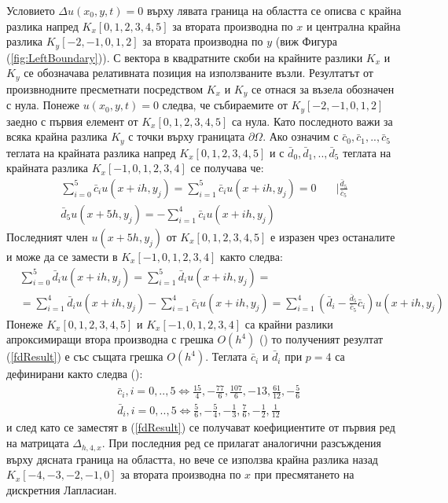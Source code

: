 \documentclass{article}
\newcommand{\rf}[1]{(\ref{#1})}
\begin{document}
Условието $\Delta u(x_0, y, t) = 0$ върху лявата граница на областта се описва с крайна разлика напред $K_x[0,1,2,3,4,5]$ за втората производна по $x$ и централна крайна разлика $K_y[-2,-1,0,1,2]$ за втората производна по $y$ (виж Фигура \rf{fig:LeftBoundary}). С вектора в квадратните скоби на крайните разлики $K_x$ и $K_y$ се обозначава релативната позиция на използваните възли. Резултатът от произвнодните пресметнати посредством $K_x$ и $K_y$ се отнася за възела обозначен с нула. Понеже $u(x_0, y, t) = 0$ следва, че събираемите от $K_y[-2,-1,0,1,2]$ заедно с първия елемент от $K_x[0,1,2,3,4,5]$ са нула. Като последното важи за всяка крайна разлика $K_y$ с точки върху границата $\partial \Omega$. Ако означим с $\bar c_0, \bar c_1, .., \bar c_5$ теглата на крайната разлика напред $K_x[0,1,2,3,4,5]$ и с $\bar d_0, \bar d_1,.., \bar d_5$ теглата на крайната разлика $K_x[-1,0,1,2,3,4]$ се получава че:
\begin{align}
\sum\limits_{i=0}^{5} \bar c_i u(x+ih, y_j) = \sum\limits_{i=1}^{5} \bar c_i u(x+ih, y_j) = 0 &  \quad | \frac{\bar d_5}{\bar c_5} \nonumber\\
\bar d_5 u(x+5h, y_j) = -\sum\limits_{i=1}^{4} \bar c_i u(x+ih, y_j) & \nonumber
\end{align}
Последният член $u(x+5h, y_j)$ от $K_x[0,1,2,3,4,5]$ е изразен чрез останалите и може да се замести в $K_x[-1,0,1,2,3,4]$ както следва:
\begin{align}\label{fdResult}
&\sum\limits_{i=0}^{5} \bar d_i u(x+ih, y_j) = \sum\limits_{i=1}^{5} \bar d_i u(x+ih, y_j)  =  \\
&= \sum\limits_{i=1}^{4} \bar d_i u(x+ih, y_j) -\sum\limits_{i=1}^{4} \bar c_i u(x+ih, y_j) = \sum\limits_{i=1}^{4} \left( \bar d_i - \frac{\bar d_5}{\bar c_5} \bar c_i \right) u(x+ih, y_j) \nonumber
\end{align}
Понеже $K_x[0,1,2,3,4,5]$ и $K_x[-1,0,1,2,3,4]$ са крайни разлики апроксимиращи втора производна с грешка $O(h^4)$ (\cite{forn}) то полученият резултат \rf{fdResult} е със същата грешка $O(h^4)$. Теглата $\bar c_i$ и $\bar d_i$ при $p=4$ са дефинирани както следва (\cite{forn}):
\begin{align}
&\bar c_i, i = 0,..,5 \iff \frac{15}{4}, -\frac{77}{6}, \frac{107}{6}, -13, \frac{61}{12}, -\frac{5}{6} \\
&\bar d_i, i = 0,..,5 \iff \frac{5}{6}, -\frac{5}{4}, -\frac{1}{3}, \frac{7}{6}, -\frac{1}{2}, \frac{1}{12} 
\end{align}
и след като се заместят в \rf{fdResult} се получават коефициентите от първия ред на матрицата $\Delta_{h,4,x}$. При последния ред се прилагат аналогични разсъждения върху дясната граница на областта, но вече се използва крайна разлика назад $K_x[-4,-3,-2,-1,0]$ за втората производна по $x$ при пресмятането на дискретния Лапласиан. 
\end{document}
